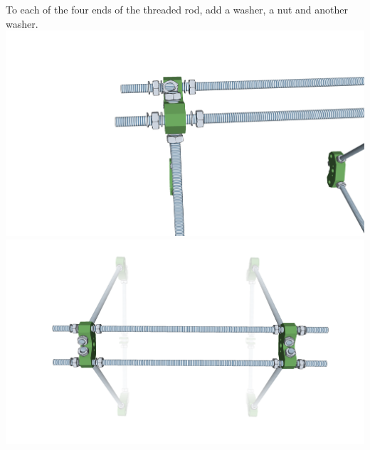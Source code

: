 \documentclass[twoside,openany,a4paper,titlepage]{memoir}
\begin{document}
	\section{}
	To each of the four ends of the threaded rod, add a washer, a nut and another washer.\\
	\includegraphics[width=1\linewidth]{graphics/ch4_4_1.png}
	\includegraphics[width=1\linewidth]{graphics/ch4_4_2.png}
	
\end{document}

